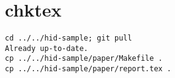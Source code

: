\appendix
\section{chktex}
\begin{tiny}
\begin{verbatim}
cd ../../hid-sample; git pull
Already up-to-date.
cp ../../hid-sample/paper/Makefile .
cp ../../hid-sample/paper/report.tex .
\end{verbatim}
\end{tiny}
